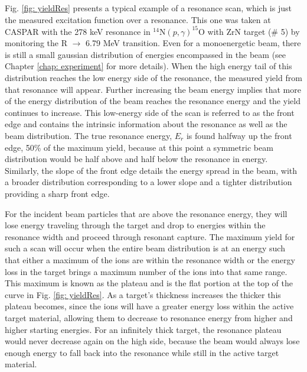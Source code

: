 Fig. \ref{fig: yieldRes} presents a typical example of a resonance scan, which is just the measured excitation function over a resonance. This one was taken at CASPAR with the 278 keV resonance in $^{14}$N$\left( p,\gamma \right) ^{15}$O with ZrN target (\# 5) by monitoring the R $\rightarrow$ 6.79 MeV transition. Even for a monoenergetic beam, there is still a small gaussian distribution of energies encompassed in the beam (see Chapter \ref{chap: experiment} for more details). When the high energy tail of this distribution reaches the low energy side of the resonance, the measured yield from that resonance will appear. Further increasing the beam energy implies that more of the energy distribution of the beam reaches the resonance energy and the yield continues to increase. This low-energy side of the scan is referred to as the front edge and contains the intrinsic information about the resonance as well as the beam distribution. The true resonance energy, $E_{r}$ is found halfway up the front edge, 50\% of the maximum yield, because at this point a symmetric beam distribution would be half above and half below the resonance in energy. Similarly, the slope of the front edge details the energy spread in the beam, with a broader distribution corresponding to a lower slope and a tighter distribution providing a sharp front edge. 

For the incident beam particles that are above the resonance energy, they will lose energy traveling through the target and drop to energies within the resonance width and proceed through resonant capture. The maximum yield for such a scan will occur when the entire beam distribution is at an energy such that either a maximum of the ions are within the resonance width or the energy loss in the target brings a maximum number of the ions into that same range.  This maximum is known as the plateau and is the flat portion at the top of the curve in Fig. \ref{fig: yieldRes}. As a target's thickness increases the thicker this plateau becomes, since the ions will have a greater energy loss within the active target material, allowing them to decrease to resonance energy from higher and higher starting energies. For an infinitely thick target, the resonance plateau would never decrease again on the high side, because the beam would always lose enough energy to fall back into the resonance while still in the active target material. 

